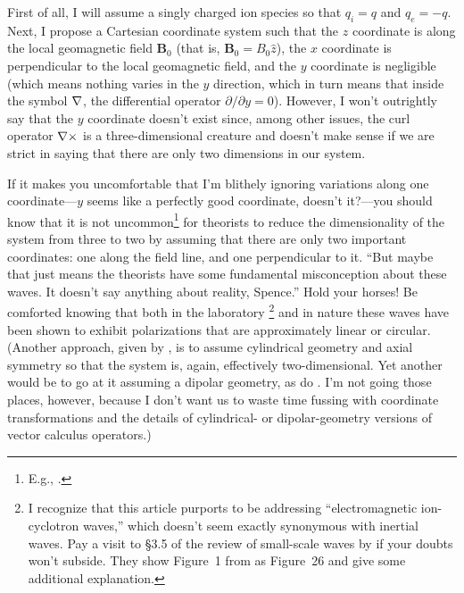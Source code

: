 First of all, I will assume a singly charged ion species so that $q_i = q$ and
$q_e = -q$. Next, I propose a Cartesian coordinate system such that the $z$
coordinate is along the local geomagnetic field $\mathbf{B}_0$ (that is,
$\mathbf{B}_0 = B_0 \hat{z}$), the $x$ coordinate is perpendicular to the local
geomagnetic field, and the $y$ coordinate is negligible (which means nothing
varies in the $y$ direction, which in turn means that inside the symbol ${\bf \nabla}$,
the differential operator $\partial / \partial y = 0$). However, I won't
outrightly say that the $y$ coordinate doesn't exist since, among other issues,
the curl operator ${\bf \nabla} \times$ is a three-dimensional creature and doesn't
make sense if we are strict in saying that there are only two dimensions in our
system.

If it makes you uncomfortable that I'm blithely ignoring variations along one
coordinate---$y$ seems like a perfectly good coordinate, doesn't it?---you
should know that it is not uncommon\footnote{E.g.,
  \citet{Hasegawa1976,Chmyrev1988,Streltsov1995,Bellan1996}.} for theorists to
reduce the dimensionality of the system from three to two by assuming that there
are only two important coordinates: one along the field line, and one
perpendicular to it. ``But maybe that just means the theorists have some
fundamental misconception about these waves. It doesn't say anything about
reality, Spence.'' Hold your horses! Be comforted knowing that both in the
laboratory \citep[Figure 1 in][]{Vincena1999}\footnote{I recognize that this
  article purports to be addressing ``electromagnetic ion-cyclotron waves,''
  which doesn't seem exactly synonymous with inertial \Alf waves. Pay a visit to
  \S3.5 of the review of small-scale \Alf waves by \citet{Stasiewicz2000} if
  your doubts won't subside. They show Figure~1 from \citet{Vincena1999} as
  Figure~26 and give some additional explanation.} and in nature
\citep{Stasiewicz2000} these waves have been shown to exhibit polarizations that
are approximately linear or circular. (Another approach, given by
\citet{Morales1994}, is to assume cylindrical geometry and axial symmetry so
that the system is, again, effectively two-dimensional. Yet another would be to
go at it assuming a dipolar geometry, as do \citet{Lysak2013}. I'm not going
those places, however, because I don't want us to waste time fussing with
coordinate transformations and the details of cylindrical- or dipolar-geometry
versions of vector calculus operators.)

